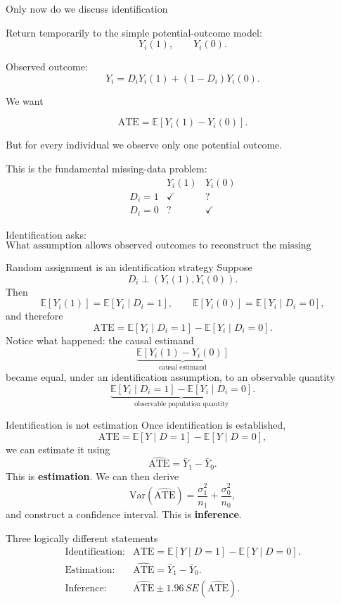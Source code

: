 \documentclass[aspectratio=169,11pt]{beamer}
\newcommand{\E}{\mathbb{E}}
\newcommand{\ATE}{\mathrm{ATE}}
\begin{document}
\begin{frame}{Only now do we discuss identification}

Return temporarily to the simple potential-outcome model:
\[
Y_i(1),\qquad Y_i(0).
\]

Observed outcome:
\[
Y_i
=
D_iY_i(1)+(1-D_i)Y_i(0).
\]

We want

\[
\ATE=\E[Y_i(1)-Y_i(0)].
\]

But for every individual we observe only one potential outcome.

This is the fundamental missing-data problem:
\[
\begin{array}{c|cc}
 & Y_i(1) & Y_i(0)\\
\hline
D_i=1 & \checkmark & ?\\
D_i=0 & ? & \checkmark
\end{array}
\]

Identification asks:
\[
\boxed{
\text{What assumption allows observed outcomes to reconstruct
the missing counterfactual?}
}
\]

\end{frame}

\begin{frame}{Random assignment is an identification strategy}
Suppose
\[
D_i \perp \left(Y_i(1),Y_i(0)\right).
\]
Then
\[
\E[Y_i(1)] = \E[Y_i\mid D_i=1],
\qquad
\E[Y_i(0)] = \E[Y_i\mid D_i=0],
\]
and therefore
\[
\boxed{\ATE = \E[Y_i\mid D_i=1]-\E[Y_i\mid D_i=0].}
\]
Notice what happened: the causal estimand
\[
\underbrace{\E[Y_i(1)-Y_i(0)]}_{\text{causal estimand}}
\]
became equal, under an identification assumption, to an observable quantity
\[
\underbrace{\E[Y_i\mid D_i=1]-\E[Y_i\mid D_i=0]}_{\text{observable population quantity}}.
\]
\end{frame}

\begin{frame}{Identification is not estimation}
Once identification is established,
\[
\ATE = \E[Y\mid D=1]-\E[Y\mid D=0],
\]
we can estimate it using
\[
\boxed{\widehat{\ATE} = \bar Y_1-\bar Y_0.}
\]
This is \textbf{estimation}. We can then derive
\[
\mathrm{Var}(\widehat{\ATE}) = \frac{\sigma_1^2}{n_1}+\frac{\sigma_0^2}{n_0},
\]
and construct a confidence interval. This is \textbf{inference}.

\begin{alertblock}{Three logically different statements}
\[
\begin{array}{ll}
\text{Identification:}
&
\ATE = \E[Y\mid D=1]-\E[Y\mid D=0].
\\[0.25em]
\text{Estimation:}
&
\widehat{\ATE}=\bar Y_1-\bar Y_0.
\\[0.25em]
\text{Inference:}
&
\widehat{\ATE}\pm 1.96\,SE(\widehat{\ATE}).
\end{array}
\]
\end{alertblock}
\end{frame}
\end{document}
